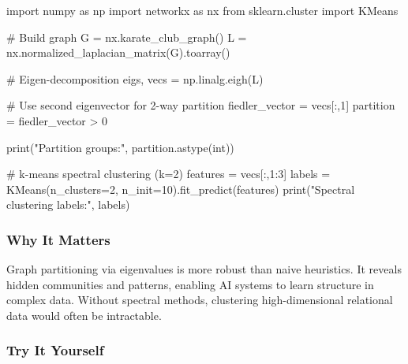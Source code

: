 \documentclass[
  letterpaper,
  DIV=11,
  numbers=noendperiod]{scrreprt}
\newenvironment{Shaded}{\begin{snugshade}}{\end{snugshade}}
\newcommand{\BuiltInTok}[1]{\textcolor[rgb]{0.00,0.23,0.31}{#1}}
\newcommand{\CommentTok}[1]{\textcolor[rgb]{0.37,0.37,0.37}{#1}}
\newcommand{\DecValTok}[1]{\textcolor[rgb]{0.68,0.00,0.00}{#1}}
\newcommand{\ImportTok}[1]{\textcolor[rgb]{0.00,0.46,0.62}{#1}}
\newcommand{\NormalTok}[1]{\textcolor[rgb]{0.00,0.23,0.31}{#1}}
\newcommand{\OperatorTok}[1]{\textcolor[rgb]{0.37,0.37,0.37}{#1}}
\newcommand{\StringTok}[1]{\textcolor[rgb]{0.13,0.47,0.30}{#1}}
\begin{document}
\begin{Shaded}
\begin{Highlighting}[]
\ImportTok{import}\NormalTok{ numpy }\ImportTok{as}\NormalTok{ np}
\ImportTok{import}\NormalTok{ networkx }\ImportTok{as}\NormalTok{ nx}
\ImportTok{from}\NormalTok{ sklearn.cluster }\ImportTok{import}\NormalTok{ KMeans}

\CommentTok{\# Build graph}
\NormalTok{G }\OperatorTok{=}\NormalTok{ nx.karate\_club\_graph()}
\NormalTok{L }\OperatorTok{=}\NormalTok{ nx.normalized\_laplacian\_matrix(G).toarray()}

\CommentTok{\# Eigen{-}decomposition}
\NormalTok{eigs, vecs }\OperatorTok{=}\NormalTok{ np.linalg.eigh(L)}

\CommentTok{\# Use second eigenvector for 2{-}way partition}
\NormalTok{fiedler\_vector }\OperatorTok{=}\NormalTok{ vecs[:,}\DecValTok{1}\NormalTok{]}
\NormalTok{partition }\OperatorTok{=}\NormalTok{ fiedler\_vector }\OperatorTok{\textgreater{}} \DecValTok{0}

\BuiltInTok{print}\NormalTok{(}\StringTok{"Partition groups:"}\NormalTok{, partition.astype(}\BuiltInTok{int}\NormalTok{))}

\CommentTok{\# k{-}means spectral clustering (k=2)}
\NormalTok{features }\OperatorTok{=}\NormalTok{ vecs[:,}\DecValTok{1}\NormalTok{:}\DecValTok{3}\NormalTok{]}
\NormalTok{labels }\OperatorTok{=}\NormalTok{ KMeans(n\_clusters}\OperatorTok{=}\DecValTok{2}\NormalTok{, n\_init}\OperatorTok{=}\DecValTok{10}\NormalTok{).fit\_predict(features)}
\BuiltInTok{print}\NormalTok{(}\StringTok{"Spectral clustering labels:"}\NormalTok{, labels)}
\end{Highlighting}
\end{Shaded}

\subsubsection{Why It Matters}\label{why-it-matters-74}

Graph partitioning via eigenvalues is more robust than naive heuristics.
It reveals hidden communities and patterns, enabling AI systems to learn
structure in complex data. Without spectral methods, clustering
high-dimensional relational data would often be intractable.

\subsubsection{Try It Yourself}\label{try-it-yourself-176}
\end{document}
